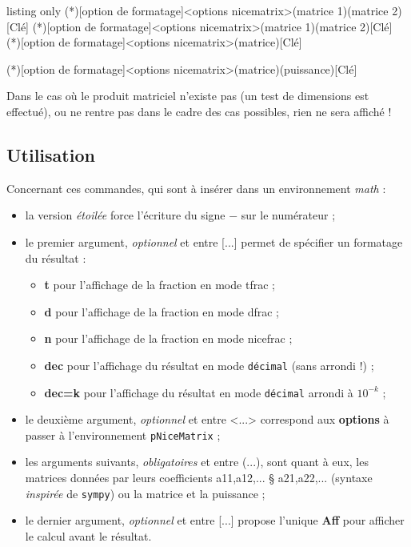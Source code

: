 \documentclass[french,a4paper,11pt]{article}
\newcommand\Cle[1]{{\bfseries\sffamily\textlangle #1\textrangle}}
\newcommand\cmaj[1]{\tcbox[vignetteMaJ]{#1}\xspace}
\begin{document}
\begin{PresentationCode}{listing only}
\ProduitMatrices(*)[option de formatage]<options nicematrix>(matrice 1)(matrice 2)[Clé]
\ProduitMatricesPY(*)[option de formatage]<options nicematrix>(matrice 1)(matrice 2)[Clé]
\CarreMatrice(*)[option de formatage]<options nicematrix>(matrice)[Clé]

\MatricePuissancePY(*)[option de formatage]<options nicematrix>(matrice)(puissance)[Clé]
\end{PresentationCode}

\begin{warningblock}
Dans le cas où le produit matriciel n'existe pas (un test de dimensions est effectué), ou ne rentre pas dans le cadre des cas possibles, rien ne sera affiché !
\end{warningblock}

\subsection{Utilisation}

\begin{tipblock}
Concernant ces commandes, qui sont à insérer dans un environnement \textit{math} :

\begin{itemize}
	\item \cmaj{0.1.3} la version \textit{étoilée} force l'écriture du signe \og $-$ \fg{} sur le numérateur ;
	\item le premier argument, \textit{optionnel} et entre \textsf{[...]} permet de spécifier un formatage du résultat :
	\begin{itemize}
		\item \Cle{t} pour l'affichage de la fraction en mode \textsf{tfrac} ;
		\item \Cle{d} pour l'affichage de la fraction en mode \textsf{dfrac} ;
		\item \Cle{n} pour l'affichage de la fraction en mode \textsf{nicefrac} ;
		\item \Cle{dec} pour l'affichage du résultat en mode \texttt{décimal} (sans arrondi !) ;
		\item \Cle{dec=k} pour l'affichage du résultat en mode \texttt{décimal} arrondi à $10^{-k}$ ;
	\end{itemize}
	\item le deuxième argument, \textit{optionnel} et entre \textsf{<...>} correspond aux \Cle{options} à passer à l'environnement \texttt{pNiceMatrix} ;
	\item les arguments suivants, \textit{obligatoires} et entre \textsf{(...)}, sont quant à eux, les matrices données par leurs coefficients \textsf{a11,a12,... § a21,a22,...} (syntaxe \textit{inspirée} de \texttt{sympy}) ou la matrice et la puissance ;
	\item le dernier argument, \textit{optionnel} et entre \textsf{[...]} propose l'unique  \Cle{Aff} pour afficher le calcul avant le résultat.
\end{itemize}
\vspace*{-\baselineskip}\leavevmode
\end{tipblock}
\end{document}
